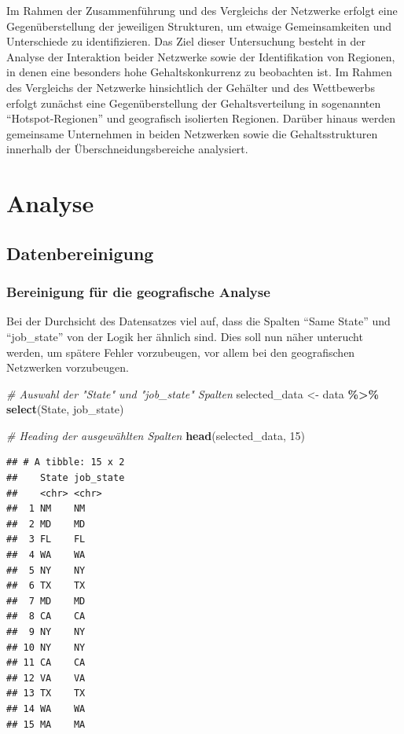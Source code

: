 \documentclass[
]{article}
\newenvironment{Shaded}{\begin{snugshade}}{\end{snugshade}}
\newcommand{\CommentTok}[1]{\textcolor[rgb]{0.56,0.35,0.01}{\textit{#1}}}
\newcommand{\DecValTok}[1]{\textcolor[rgb]{0.00,0.00,0.81}{#1}}
\newcommand{\FunctionTok}[1]{\textcolor[rgb]{0.13,0.29,0.53}{\textbf{#1}}}
\newcommand{\NormalTok}[1]{#1}
\newcommand{\OtherTok}[1]{\textcolor[rgb]{0.56,0.35,0.01}{#1}}
\newcommand{\SpecialCharTok}[1]{\textcolor[rgb]{0.81,0.36,0.00}{\textbf{#1}}}
\begin{document}
Im Rahmen der Zusammenführung und des Vergleichs der Netzwerke erfolgt
eine Gegenüberstellung der jeweiligen Strukturen, um etwaige
Gemeinsamkeiten und Unterschiede zu identifizieren. Das Ziel dieser
Untersuchung besteht in der Analyse der Interaktion beider Netzwerke
sowie der Identifikation von Regionen, in denen eine besonders hohe
Gehaltskonkurrenz zu beobachten ist. Im Rahmen des Vergleichs der
Netzwerke hinsichtlich der Gehälter und des Wettbewerbs erfolgt zunächst
eine Gegenüberstellung der Gehaltsverteilung in sogenannten
``Hotspot-Regionen'' und geografisch isolierten Regionen. Darüber hinaus
werden gemeinsame Unternehmen in beiden Netzwerken sowie die
Gehaltsstrukturen innerhalb der Überschneidungsbereiche analysiert.

\newpage

\section{Analyse}\label{analyse}

\subsection{Datenbereinigung}\label{datenbereinigung}

\subsubsection{Bereinigung für die geografische
Analyse}\label{bereinigung-fuxfcr-die-geografische-analyse}

Bei der Durchsicht des Datensatzes viel auf, dass die Spalten ``Same
State'' und ``job\_state'' von der Logik her ähnlich sind. Dies soll nun
näher unterucht werden, um spätere Fehler vorzubeugen, vor allem bei den
geografischen Netzwerken vorzubeugen.

\begin{Shaded}
\begin{Highlighting}[]
\CommentTok{\# Auswahl der "State" und "job\_state" Spalten}
\NormalTok{selected\_data }\OtherTok{\textless{}{-}}\NormalTok{ data }\SpecialCharTok{\%\textgreater{}\%}
  \FunctionTok{select}\NormalTok{(State, job\_state)}

\CommentTok{\# Heading der ausgewählten Spalten}
\FunctionTok{head}\NormalTok{(selected\_data, }\DecValTok{15}\NormalTok{)}
\end{Highlighting}
\end{Shaded}

\begin{verbatim}
## # A tibble: 15 x 2
##    State job_state
##    <chr> <chr>    
##  1 NM    NM       
##  2 MD    MD       
##  3 FL    FL       
##  4 WA    WA       
##  5 NY    NY       
##  6 TX    TX       
##  7 MD    MD       
##  8 CA    CA       
##  9 NY    NY       
## 10 NY    NY       
## 11 CA    CA       
## 12 VA    VA       
## 13 TX    TX       
## 14 WA    WA       
## 15 MA    MA
\end{verbatim}
\end{document}

